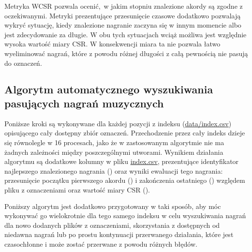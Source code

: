 Metryka WCSR pozwala ocenić, w jakim stopniu znalezione akordy są zgodne z oczekiwanymi. Metryki prezentujące przesunięcie czasowe dodatkowo pozwalają wykryć sytuację, kiedy znalezione nagranie zaczyna się w innym momencie albo jest zdecydowanie za długie. W obu tych sytuacjach wciąż możliwa jest względnie wysoka wartość miary CSR. W konsekwencji miara ta nie pozwala łatwo wyeliminować nagrań, które z powodu różnej długości z całą pewnością nie pasują do oznaczeń.

\subsection{Algorytm automatycznego wyszukiwania pasujących nagrań muzycznych}

Poniższe kroki są wykonywane dla każdej pozycji z indeksu (\url{data/index.csv}) opisującego cały dostępny zbiór oznaczeń. Przechodzenie przez cały indeks dzieje się równolegle w 16 procesach, jako że w zastosowanym algorytmie nie ma żadnych zależności między poszczególnymi utworami. Wynikiem działania algorytmu są dodatkowe kolumny w pliku \url{index.csv}, prezentujące identyfikator najlepszego znalezionego nagrania () oraz wyniki ewaluacji tego nagrania: przesunięcie początku pierwszego akordu () i zakończenia ostatniego () względem pliku z oznaczeniami oraz wartość miary CSR ().

Poniższy algorytm jest dodatkowo przygotowany w taki sposób, aby móc wykonywać go wielokrotnie dla tego samego indeksu w celu wyszukiwania nagrań dla nowo dodanych plików z oznaczeniami, skorzystania z dostępnych od niedawna nagrań lub po prostu kontynuacji przerwanego działania, które jest czasochłonne i może zostać przerwane z powodu różnych błędów.

